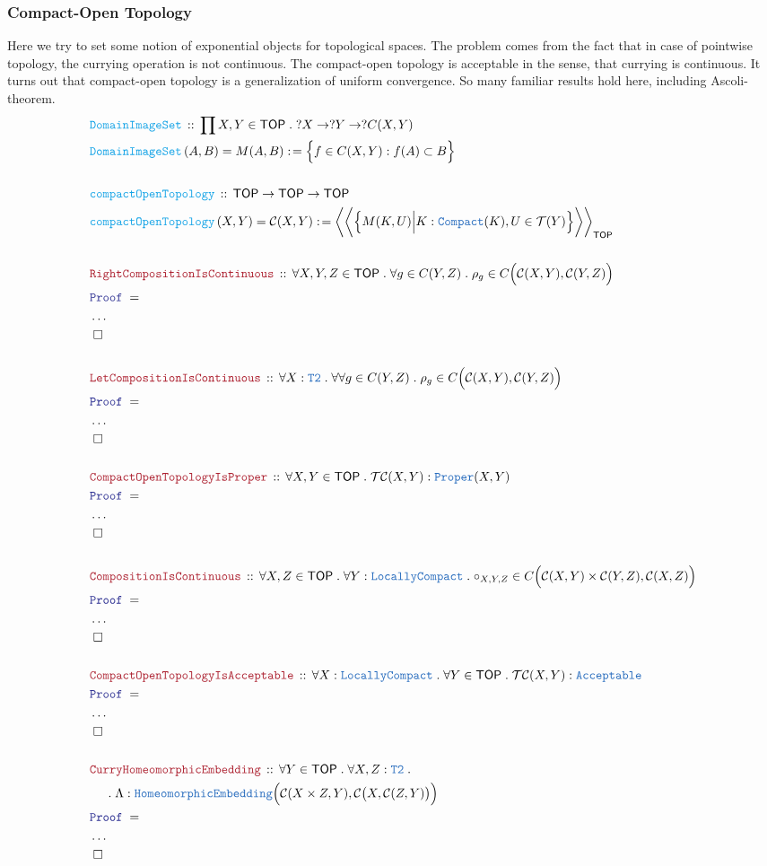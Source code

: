 \documentclass[12pt]{scrartcl}
\newcommand{\TYPE}[1]{\textcolor{NavyBlue}{\mathtt{#1}}}
\newcommand{\FUNC}[1]{\textcolor{Cerulean}{\mathtt{#1}}}
\newcommand{\LOGIC}[1]{\textcolor{Blue}{\mathtt{#1}}}
\newcommand{\THM}[1]{\textcolor{Maroon}{\mathtt{#1}}}
\renewcommand{\.}{\; . \;}
\newcommand{\de}{: \kern 0.1pc =}
\newcommand{\Act}[1]{\left( #1 \right)}
\newcommand{\Theorem}[2]{& \THM{#1} \, :: \, #2 \\ & \Proof = \\ }
\newcommand{\DeclareFunc}[2]{& \FUNC{#1} \, :: \, #2 \\}
\newcommand{\DefineNamedFunc}[4]{&  \FUNC{#1}\Act{#2} = #3 \de #4 \\}
\newcommand{\NewLine}{\\ & \kern 1pc}
\newcommand{\Page}[1]{ \begin{align*} #1 \end{align*}   }
\newcommand{\NoProof}{ & \ldots \\ \EndProof}
\newcommand{\QED}{\; \square}
\newcommand{\EndProof}{& \QED \\}
\newcommand{\Proof}{\LOGIC{Proof} \; }
\renewcommand{\C}{\mathcal{C}}
\newcommand{\TOP}{\mathsf{TOP}}
\newcommand{\T}{\mathcal{T}}
\begin{document}
\subsubsection{Compact-Open Topology}
Here we try to set some notion of exponential objects for topological spaces.
The problem comes from the fact that in case of pointwise topology,
the currying operation is not continuous.
The compact-open topology is acceptable in the sense,
that currying is continuous.
It turns out that compact-open topology is a generalization of uniform convergence.
So many familiar results hold here, including Ascoli-theorem.
\Page{
	\DeclareFunc{DomainImageSet}{ \prod X,Y \in \TOP \. ?X \to ?Y \to ?C(X,Y)}
	\DefineNamedFunc{DomainImageSet}{A,B}{M(A,B)}{\Big\{f \in C(X,Y) : f(A) \subset B \Big\}}
	\\
	\DeclareFunc{compactOpenTopology}{\TOP \to \TOP \to \TOP}
	\DefineNamedFunc{compactOpenTopology}{X,Y}{\C(X,Y)}
	{ \bigg\langle\bigg\langle\Big\{ M(K,U) \Big| K : \TYPE{Compact}(K), U \in \T(Y) \Big\}\bigg\rangle\bigg\rangle_\TOP}
	\\
	\Theorem{RightCompositionIsContinuous}
	{
		\forall X,Y,Z \in \TOP \.
		\forall g \in C(Y,Z) \.
		\rho_g \in C\Big( \C(X,Y),\C(Y,Z) \Big)
	}
	\NoProof
	\\
	\Theorem{LetCompositionIsContinuous}
	{
		\forall X  : \TYPE{T2}  \.
		\forall 
		\forall g \in C(Y,Z) \.
		\rho_g \in C\Big( \C(X,Y),\C(Y,Z) \Big)
	}
	\NoProof
	\\
	\Theorem{CompactOpenTopologyIsProper}
	{
		\forall X,Y \in \TOP \.
		\T\C(X,Y) : \TYPE{Proper}(X,Y)
	}
	\NoProof
	\\
	\Theorem{CompositionIsContinuous}
	{
		\forall X,Z \in \TOP \.
		\forall Y  :\TYPE{LocallyCompact} \.
		\circ_{X,Y,Z} \in C\Big( \C(X,Y) \times \C(Y,Z), \C(X,Z) \Big)
	}
	\NoProof
	\\
	\Theorem{CompactOpenTopologyIsAcceptable}
	{
		\forall X : \TYPE{LocallyCompact} \.
		\forall Y \in \TOP \.
		\T\C(X,Y) : \TYPE{Acceptable}
	}
	\NoProof
	\\
	\Theorem{CurryHomeomorphicEmbedding}
	{
		\forall Y \in \TOP \.
		\forall X,Z : \TYPE{T2} \. \NewLine \. 
		\Lambda : \TYPE{HomeomorphicEmbedding}\Big( \C(X \times Z, Y), \C\big(X,\C(Z,Y)\big) \Big)
	}
	\NoProof
}
\end{document}

